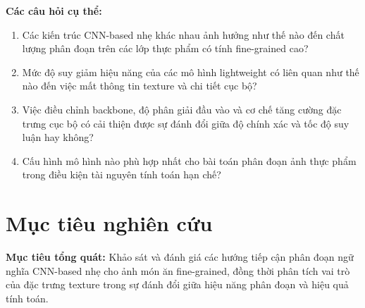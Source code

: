 

\textbf{Các câu hỏi cụ thể:}
\begin{enumerate}
\item Các kiến trúc CNN-based nhẹ khác nhau ảnh hưởng như thế nào đến chất lượng phân đoạn trên các lớp thực phẩm có tính fine-grained cao?
\item Mức độ suy giảm hiệu năng của các mô hình lightweight có liên quan như thế nào đến việc mất thông tin texture và chi tiết cục bộ?
\item Việc điều chỉnh backbone, độ phân giải đầu vào và cơ chế tăng cường đặc trưng cục bộ có cải thiện được sự đánh đổi giữa độ chính xác và tốc độ suy luận hay không?
\item Cấu hình mô hình nào phù hợp nhất cho bài toán phân đoạn ảnh thực phẩm trong điều kiện tài nguyên tính toán hạn chế?
\end{enumerate}

\section{Mục tiêu nghiên cứu}
\textbf{Mục tiêu tổng quát:}  
Khảo sát và đánh giá các hướng tiếp cận phân đoạn ngữ nghĩa CNN-based nhẹ cho ảnh món ăn fine-grained, đồng thời phân tích vai trò của đặc trưng texture trong sự đánh đổi giữa hiệu năng phân đoạn và hiệu quả tính toán.

